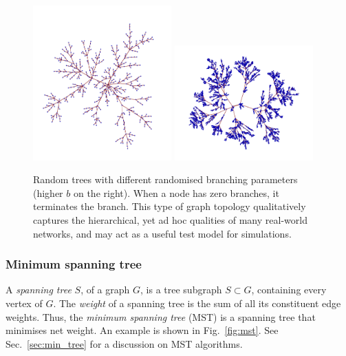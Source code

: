 	\begin{figure}[!htbp]
	\includegraphics[width=0.475\textwidth]{random_tree_1}
	\includegraphics[width=0.475\textwidth]{random_tree_2}
	\caption{Random trees with different randomised branching parameters (higher $b$ on the right). When a node has zero branches, it terminates the branch. This type of graph topology qualitatively captures the hierarchical, yet ad hoc qualities of many real-world networks, and may act as a useful test model for simulations.} \label{fig:random_tree}
	\end{figure}
\fi

%
%

\subsubsection{Minimum spanning tree} \label{sec:graph_MST} 

A \textit{spanning tree} $S$, of a graph $G$, is a tree subgraph \mbox{$S\subset G$}, containing every vertex of $G$. The \textit{weight} of a spanning tree is the sum of all its constituent edge weights. Thus, the \textit{minimum spanning tree} (MST) is a spanning tree that minimises net weight. An example is shown in Fig.~\ref{fig:mst}. See Sec.~\ref{sec:min_tree} for a discussion on MST algorithms.

